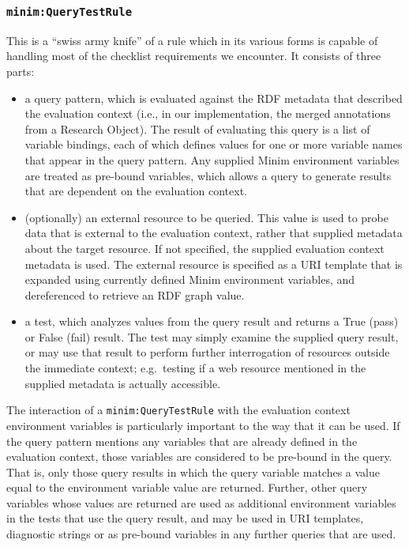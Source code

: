 \documentclass[]{article}
\begin{document}
\subsubsection{\texttt{minim:QueryTestRule}}

This is a ``swiss army knife'' of a rule which in its various forms is
capable of handling most of the checklist requirements we encounter. It
consists of three parts:

\begin{itemize}
\itemsep1pt\parskip0pt
\item
  a query pattern, which is evaluated against the RDF metadata that
  described the evaluation context (i.e., in our implementation, the
  merged annotations from a Research Object). The result of evaluating
  this query is a list of variable bindings, each of which defines
  values for one or more variable names that appear in the query
  pattern. Any supplied Minim environment variables are treated as
  pre-bound variables, which allows a query to generate results that are
  dependent on the evaluation context.
\item
  (optionally) an external resource to be queried. This value is used to
  probe data that is external to the evaluation context, rather that
  supplied metadata about the target resource. If not specified, the
  supplied evaluation context metadata is used. The external resource is
  specified as a URI template that is expanded using currently defined
  Minim environment variables, and dereferenced to retrieve an RDF graph
  value.
\item
  a test, which analyzes values from the query result and returns a True
  (pass) or False (fail) result. The test may simply examine the
  supplied query result, or may use that result to perform further
  interrogation of resources outside the immediate context; e.g.~testing
  if a web resource mentioned in the supplied metadata is actually
  accessible.
\end{itemize}

The interaction of a \texttt{minim:QueryTestRule} with the evaluation
context environment variables is particularly important to the way that
it can be used. If the query pattern mentions any variables that are
already defined in the evaluation context, those variables are
considered to be pre-bound in the query. That is, only those query
results in which the query variable matches a value equal to the
environment variable value are returned. Further, other query variables
whose values are returned are used as additional environment variables
in the tests that use the query result, and may be used in URI
templates, diagnostic strings or as pre-bound variables in any further
queries that are used.
\end{document}
